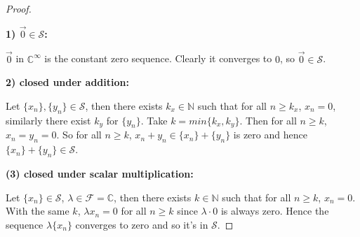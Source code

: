 \documentclass{article}
\begin{document}
\begin{proof}
$ $ \newline

\textbf{1) $\vec{0} \in \mathcal{S}$:}

$\vec{0}$ in $\mathbb{C}^\infty$ is the constant zero sequence. Clearly it converges to $0$, so $\vec{0} \in \mathcal{S}$.

\textbf{2) closed under addition:}

Let $\{ x_n \}, \{ y_n \} \in \mathcal{S}$, then there exists $k_x \in \mathbb{N}$ such that for all $n \ge k_x$, $x_n =0$, similarly there exist $k_y$ for $\{ y_n \}$. Take $k = min\{ k_x, k_y \}$. Then for all $n \ge k$, $x_n = y_n =0$. So for all $n \ge k$, $ x_n + y_n \in \{x_n\} + \{y_n \}$ is zero and hence $\{x_n\} + \{y_n \} \in \mathcal{S}$.

\textbf{(3) closed under scalar multiplication:}

Let $\{ x_n \} \in \mathcal{S}$, $ \lambda \in \mathcal{F} = \mathbb{C}$, then there exists $k \in \mathbb{N}$ such that for all $n \ge k$, $x_n =0$. With the same $k$, $\lambda x_n = 0$ for all $n \ge k$ since $\lambda \cdot 0$ is always zero. Hence the sequence $\lambda \{x_n \}$ converges to zero and so it's in $\mathcal{S}$.
\end{proof}
\end{document}
